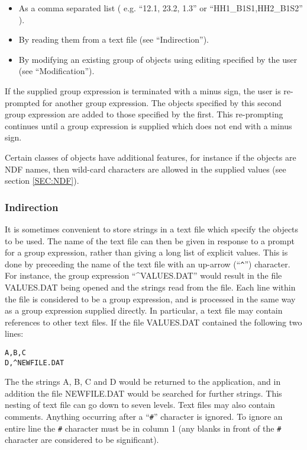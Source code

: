 \begin{itemize}
\item As a comma separated list ( e.g. ``12.1, 23.2, 1.3''
     or ``HH1\_B1S1,HH2\_B1S2'' ). 

\item By reading them from a text file (see ``Indirection'').

\item By modifying an existing group of objects using editing 
     specified by the user (see ``Modification'').
\end{itemize}
If the supplied group expression is terminated with a minus
sign, the user is re-prompted for another group expression. The
objects specified by this second group expression are added to
those specified by the first. This re-prompting continues until
a group expression is supplied which does not end with a minus
sign. 

Certain classes of objects have additional features, for 
instance if the objects are {\small NDF} names, then wild-card characters 
are allowed in the supplied values (see section \ref{SEC:NDF}).

\subsubsection{Indirection}
It is sometimes convenient to store strings in a text file which specify the
objects to be used. The name of the text file can
then be given in response to a prompt for a group expression,
rather than giving a long list of explicit values. This is done
by preceeding the name of the text file with an up-arrow (``\verb+^+'')
character. For instance, the group expression ``\^{}{\small VALUES.DAT}''
would result in the file {\small VALUES.DAT} being opened and the strings
read from the file. Each line within the file is considered to
be a group expression, and is processed in the same way as a
group expression supplied directly. In particular, a text file
may contain references to other text files. If the file
{\small VALUES.DAT} contained the following two lines: 

\small
\begin{verbatim}
A,B,C
D,^NEWFILE.DAT
\end{verbatim}
\normalsize

The the strings A, B, C and D would be returned to the 
application, and in addition the file {\small NEWFILE.DAT} would be 
searched for further strings. This nesting of text file can go
down to seven levels. Text files may also contain comments. 
Anything occurring after a ``\verb+#+'' character is ignored. To ignore
an entire line the \verb+#+ character must be in column 1 (any blanks in 
front of the \verb+#+ character are considered to be significant).

